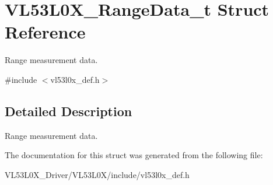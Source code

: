 \hypertarget{structVL53L0X__RangeData__t}{}\section{V\+L53\+L0\+X\+\_\+\+Range\+Data\+\_\+t Struct Reference}
\label{structVL53L0X__RangeData__t}


Range measurement data.  




{\ttfamily \#include $<$vl53l0x\+\_\+def.\+h$>$}



\subsection{Detailed Description}
Range measurement data. 

The documentation for this struct was generated from the following file\+:\begin{DoxyCompactItemize}
\item 
V\+L53\+L0\+X\+\_\+\+Driver/\+V\+L53\+L0\+X/include/vl53l0x\+\_\+def.\+h\end{DoxyCompactItemize}
